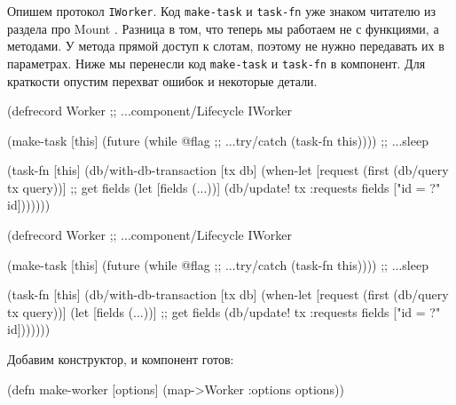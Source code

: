 
Опишем протокол \verb|IWorker|. Код \verb|make-task| и \verb|task-fn| уже знаком
читателю из раздела про Mount . Разница в том, что теперь мы
работаем не с функциями, а методами. У метода прямой доступ к слотам, поэтому не
нужно передавать их в параметрах. Ниже мы перенесли код \verb|make-task| и
\verb|task-fn| в компонент. Для краткости опустим перехват ошибок и некоторые
детали.

\ifx\DEVICETYPE\MOBILE

\begin{english}
  \begin{clojure}
(defrecord Worker
  ;; ...component/Lifecycle
  IWorker

  (make-task [this]
    (future
      (while @flag    ;; ...try/catch
        (task-fn this)))) ;; ...sleep

  (task-fn [this]
    (db/with-db-transaction [tx db]
      (when-let [request
                  (first
                    (db/query tx query))]
        ;; get fields
        (let [fields (...))]
          (db/update! tx :requests
            fields ["id = ?" id]))))))
  \end{clojure}
\end{english}

\else

\begin{english}
  \begin{clojure}
(defrecord Worker
  ;; ...component/Lifecycle
  IWorker

  (make-task [this]
    (future
      (while @flag        ;; ...try/catch
        (task-fn this)))) ;; ...sleep

  (task-fn [this]
    (db/with-db-transaction [tx db]
      (when-let [request (first (db/query tx query))]
        (let [fields (...))] ;; get fields
          (db/update! tx :requests
                      fields ["id = ?" id]))))))
  \end{clojure}
\end{english}

\fi

\noindent
Добавим конструктор, и компонент готов:


\begin{english}
  \begin{clojure}
(defn make-worker
  [options]
  (map->Worker {:options options}))
  \end{clojure}
\end{english}

